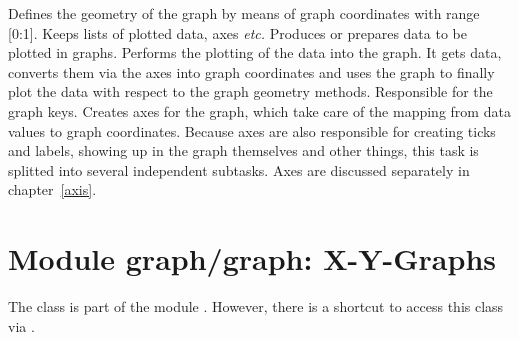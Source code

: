 \begin{definitions}
  Defines the geometry of the graph by means of graph coordinates with
  range [0:1]. Keeps lists of plotted data, axes \emph{etc.}
  Produces or prepares data to be plotted in graphs.
  Performs the plotting of the data into the graph. It gets data,
  converts them via the axes into graph coordinates and uses the graph
  to finally plot the data with respect to the graph geometry methods.
  Responsible for the graph keys.
  Creates axes for the graph, which take care of the mapping from data
  values to graph coordinates. Because axes are also responsible for
  creating ticks and labels, showing up in the graph themselves and
  other things, this task is splitted into several independent
  subtasks. Axes are discussed separately in chapter~\ref{axis}.
\end{definitions} %

\section{Module graph/graph: X-Y-Graphs} %
\label{graph:graph}


The class  is part of the module .
However, there is a shortcut to access this class via
.

